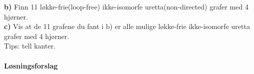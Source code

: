 \noindent \textbf{b)} Finn 11 løkke-frie(loop-free) ikke-isomorfe uretta(non-directed) grafer med 4 hjørner.\\
\textbf{c)} Vis at de 11 grafene du fant i b) er alle mulige løkke-frie ikke-isomorfe uretta grafer med 4 hjørner.\\
\indent Tips: tell kanter.

\paragraph*{Løsningsforslag} %